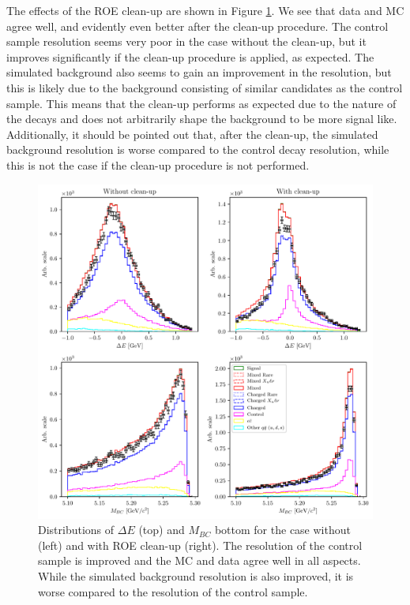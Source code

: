The effects of the ROE clean-up are shown in Figure \ref{fig:roe_val}. We see that data and MC agree well, and evidently even better after the clean-up procedure. The control sample resolution seems very poor in the case without the clean-up, but it improves significantly if the clean-up procedure is applied, as expected. The simulated background also seems to gain an improvement in the resolution, but this is likely due to the background consisting of similar candidates as the control sample. This means that the clean-up performs as expected due to the nature of the decays and does not arbitrarily shape the background to be more signal like. Additionally, it should be pointed out that, after the clean-up, the simulated background resolution is worse compared to the control decay resolution, while this is not the case if the clean-up procedure is not performed.
\begin{figure}[H]
	\centering
	\captionsetup{width=0.8\linewidth}
	\includegraphics[width=\linewidth]{fig/roe_val}
	\caption{Distributions of $\Delta E$ (top) and $M_{BC}$ bottom for the case without (left) and with ROE clean-up (right). The resolution of the control sample is improved and the MC and data agree well in all aspects. While the simulated background resolution is also improved, it is worse compared to the resolution of the control sample.}
	\label{fig:roe_val}
\end{figure}

